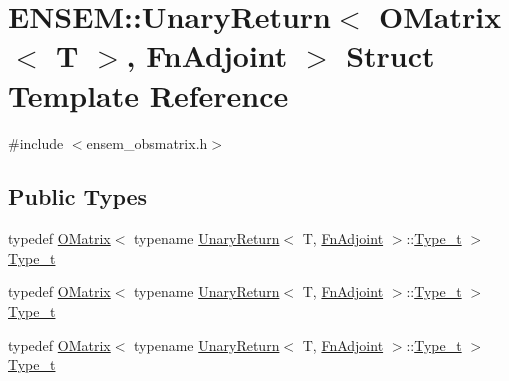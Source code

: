 \hypertarget{structENSEM_1_1UnaryReturn_3_01OMatrix_3_01T_01_4_00_01FnAdjoint_01_4}{}\section{E\+N\+S\+EM\+:\+:Unary\+Return$<$ O\+Matrix$<$ T $>$, Fn\+Adjoint $>$ Struct Template Reference}
\label{structENSEM_1_1UnaryReturn_3_01OMatrix_3_01T_01_4_00_01FnAdjoint_01_4}


{\ttfamily \#include $<$ensem\+\_\+obsmatrix.\+h$>$}

\subsection*{Public Types}
\begin{DoxyCompactItemize}
\item 
typedef \mbox{\hyperlink{classENSEM_1_1OMatrix}{O\+Matrix}}$<$ typename \mbox{\hyperlink{structENSEM_1_1UnaryReturn}{Unary\+Return}}$<$ T, \mbox{\hyperlink{structENSEM_1_1FnAdjoint}{Fn\+Adjoint}} $>$\+::\mbox{\hyperlink{structENSEM_1_1UnaryReturn_3_01OMatrix_3_01T_01_4_00_01FnAdjoint_01_4_aa00f2dd53b3936a34ade7e353b17b138}{Type\+\_\+t}} $>$ \mbox{\hyperlink{structENSEM_1_1UnaryReturn_3_01OMatrix_3_01T_01_4_00_01FnAdjoint_01_4_aa00f2dd53b3936a34ade7e353b17b138}{Type\+\_\+t}}
\item 
typedef \mbox{\hyperlink{classENSEM_1_1OMatrix}{O\+Matrix}}$<$ typename \mbox{\hyperlink{structENSEM_1_1UnaryReturn}{Unary\+Return}}$<$ T, \mbox{\hyperlink{structENSEM_1_1FnAdjoint}{Fn\+Adjoint}} $>$\+::\mbox{\hyperlink{structENSEM_1_1UnaryReturn_3_01OMatrix_3_01T_01_4_00_01FnAdjoint_01_4_aa00f2dd53b3936a34ade7e353b17b138}{Type\+\_\+t}} $>$ \mbox{\hyperlink{structENSEM_1_1UnaryReturn_3_01OMatrix_3_01T_01_4_00_01FnAdjoint_01_4_aa00f2dd53b3936a34ade7e353b17b138}{Type\+\_\+t}}
\item 
typedef \mbox{\hyperlink{classENSEM_1_1OMatrix}{O\+Matrix}}$<$ typename \mbox{\hyperlink{structENSEM_1_1UnaryReturn}{Unary\+Return}}$<$ T, \mbox{\hyperlink{structENSEM_1_1FnAdjoint}{Fn\+Adjoint}} $>$\+::\mbox{\hyperlink{structENSEM_1_1UnaryReturn_3_01OMatrix_3_01T_01_4_00_01FnAdjoint_01_4_aa00f2dd53b3936a34ade7e353b17b138}{Type\+\_\+t}} $>$ \mbox{\hyperlink{structENSEM_1_1UnaryReturn_3_01OMatrix_3_01T_01_4_00_01FnAdjoint_01_4_aa00f2dd53b3936a34ade7e353b17b138}{Type\+\_\+t}}
\end{DoxyCompactItemize}


